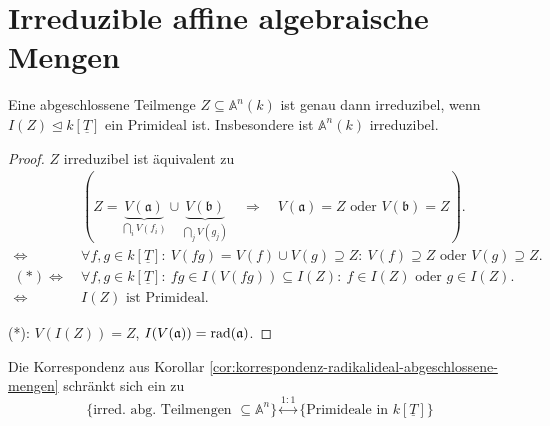 
\section{Irreduzible affine algebraische Mengen}
\label{sec:irreduzibilitaet-alg}
\begin{lem}
  \label{lem:charakterisierung-irreduzibel-alg}
  Eine abgeschlossene Teilmenge $Z\subseteq\mathbb{A}^{n}(k)$ ist genau
  dann irreduzibel, wenn $I(Z) \unlhd k[\underline{T}]$ ein Primideal ist. Insbesondere ist
  $\mathbb{A}^{n}(k)$ irreduzibel.  
\end{lem}
\begin{proof}
  $Z$ irreduzibel ist äquivalent zu 
  \begin{align*}
    & (Z=\underbrace{V(\mathfrak{a})}_{\bigcap_{i} V(f_{i})}\cup\underbrace{V(\mathfrak{b})}_{\bigcap_{j} V(g_{j})}\quad\Rightarrow\quad V(\mathfrak{a})=Z\text{ oder }V(\mathfrak{b})=Z).\\
    \Leftrightarrow\  & \forall f,g\in k[\underline{T}]:\ V(fg)=V(f)\cup V(g)\supseteq Z:\ V(f)\supseteq Z\text{ oder }V(g)\supseteq Z.\\
    (*)\Leftrightarrow\  & \forall f,g\in k[\underline{T}]:\ fg\in I(V(fg))\subseteq I(Z):\ f\in I(Z)\text{ oder }g\in I(Z).\\
    \Leftrightarrow\  & I(Z)\text{ ist Primideal.}
  \end{align*}

  ({*}): $V(I(Z))=Z$, $I(V(\mathfrak{a}))=\operatorname{rad}(\mathfrak{a})$. 
\end{proof}
\begin{rem}
  \label{rem:korrespondenz-irreduzibel-prim}
  Die Korrespondenz aus Korollar \ref{cor:korrespondenz-radikalideal-abgeschlossene-mengen} schränkt sich ein zu
  \[
    \{\text{irred. abg. Teilmengen }\subseteq\mathbb{A}^{n}\}\overset{1:1}{\leftrightarrow}\{\text{Primideale in }k[\underline{T}]\}
  \]
\end{rem}

